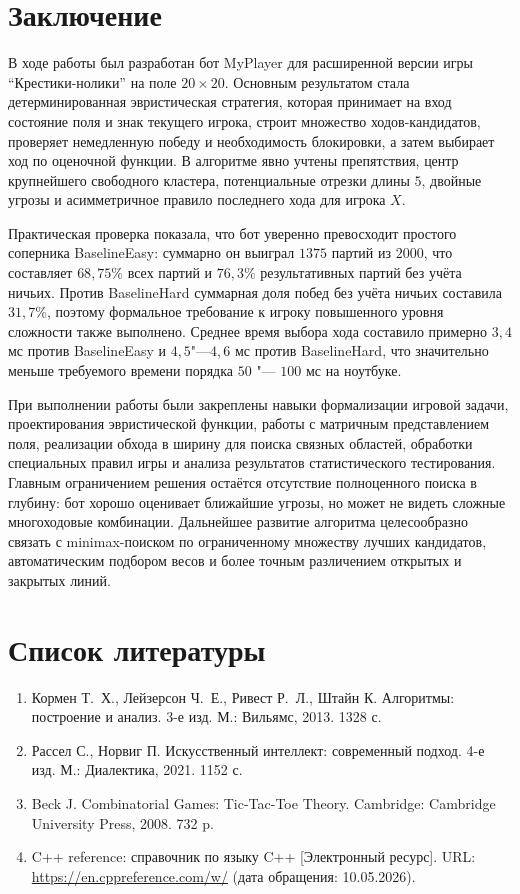 \documentclass[a4paper,14pt]{extarticle}
\begin{document}
\clearpage
\section*{Заключение}

В ходе работы был разработан бот MyPlayer для расширенной версии игры “Крестики-нолики” на поле $20 \times 20$. Основным результатом стала детерминированная эвристическая стратегия, которая принимает на вход состояние поля и знак текущего игрока, строит множество ходов-кандидатов, проверяет немедленную победу и необходимость блокировки, а затем выбирает ход по оценочной функции. В алгоритме явно учтены препятствия, центр крупнейшего свободного кластера, потенциальные отрезки длины $5$, двойные угрозы и асимметричное правило последнего хода для игрока $X$.

Практическая проверка показала, что бот уверенно превосходит простого соперника BaselineEasy: суммарно он выиграл $1375$ партий из $2000$, что составляет $68{,}75\%$ всех партий и $76{,}3\%$ результативных партий без учёта ничьих. Против BaselineHard суммарная доля побед без учёта ничьих составила $31{,}7\%$, поэтому формальное требование к игроку повышенного уровня сложности также выполнено. Среднее время выбора хода составило примерно $3{,}4$ мс против BaselineEasy и $4{,}5$"---$4{,}6$ мс против BaselineHard, что значительно меньше требуемого времени порядка $50$ "--- $100$ мс на ноутбуке.

При выполнении работы были закреплены навыки формализации игровой задачи, проектирования эвристической функции, работы с матричным представлением поля, реализации обхода в ширину для поиска связных областей, обработки специальных правил игры и анализа результатов статистического тестирования. Главным ограничением решения остаётся отсутствие полноценного поиска в глубину: бот хорошо оценивает ближайшие угрозы, но может не видеть сложные многоходовые комбинации. Дальнейшее развитие алгоритма целесообразно связать с minimax-поиском по ограниченному множеству лучших кандидатов, автоматическим подбором весов и более точным различением открытых и закрытых линий.

\clearpage
\section*{Список литературы}
\begin{enumerate}
\item Кормен Т.~Х., Лейзерсон Ч.~Е., Ривест Р.~Л., Штайн К. Алгоритмы: построение и анализ. 3-е изд. М.: Вильямс, 2013. 1328 с.
\item Рассел С., Норвиг П. Искусственный интеллект: современный подход. 4-е изд. М.: Диалектика, 2021. 1152 с.
\item Beck J. Combinatorial Games: Tic-Tac-Toe Theory. Cambridge: Cambridge University Press, 2008. 732 p.
\item C++ reference: справочник по языку C++ [Электронный ресурс]. URL: \url{https://en.cppreference.com/w/} (дата обращения: 10.05.2026).
\end{enumerate}
\end{document}
